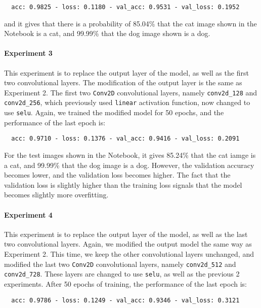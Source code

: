 \documentclass{article}
\begin{document}
\begin{verbatim}
  acc: 0.9825 - loss: 0.1180 - val_acc: 0.9531 - val_loss: 0.1952
\end{verbatim}

and it gives that there is a probability of 85.04\% that the cat image shown in the Notebook is a cat,
and 99.99\% that the dog image shown is a dog.

\paragraph{Experiment 3} This experiment is to replace the output layer of the model, as well as
the first two convolutional layers. The modification of the output layer is the same as Experiment 2.
The first two \texttt{Conv2D} convolutional layers, namely \texttt{conv2d\_128} and \texttt{conv2d\_256},
which previously used \texttt{linear} activation function, now changed to use \texttt{selu}. Again,
we trained the modified model for 50 epochs, and the performance of the last epoch is:

\begin{verbatim}
  acc: 0.9710 - loss: 0.1376 - val_acc: 0.9416 - val_loss: 0.2091
\end{verbatim}

For the test images shown in the Notebook, it gives 85.24\% that the cat iamge is a cat, and 99.99\%
that the dog image is a dog. However, the validation accuracy becomes lower, and the validation
loss becomes higher. The fact that the validation loss is slightly higher than the training loss signals
that the model becomes slightly more overfitting.

\paragraph{Experiment 4} This experiment is to replace the output layer of the model, as well as
the last two convolutional layers. Again, we modified the output model the same way as Experiment 2.
This time, we keep the other convolutional layers unchanged, and modified the last two \texttt{Conv2D}
convolutional layers, namely \texttt{conv2d\_512} and \texttt{conv2d\_728}. These layers are changed
to use \texttt{selu}, as well as the previous 2 experiments. After 50 epochs of training, the performance
of the last epoch is:

\begin{verbatim}
  acc: 0.9786 - loss: 0.1249 - val_acc: 0.9346 - val_loss: 0.3121
\end{verbatim}
\end{document}
